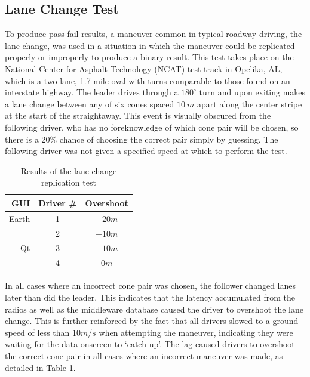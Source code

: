 \documentclass[twocolumn,10pt]{article}
\begin{document}
  \subsection*{Lane Change Test}

    To produce pass-fail results, a maneuver common in typical roadway driving, the lane change, was used in a situation in which the maneuver could be replicated properly or improperly to produce a binary result.  This test takes place on the National Center for Asphalt Technology (NCAT) test track in Opelika, AL, which is a two lane, 1.7 mile oval with turns comparable to those found on an interstate highway.  The leader drives through a $180^{\circ}$ turn and upon exiting makes a lane change between any of six cones spaced $10~m$ apart along the center stripe at the start of the straightaway.  This event is visually obscured from the following driver, who has no foreknowledge of which cone pair will be chosen, so there is a 20\% chance of choosing the correct pair simply by guessing.  The following driver was not given a specified speed at which to perform the test.

    \begin{table}[htbp] \centering
      \caption{Results of the lane change replication test}
      \begin{tabular}{rc|c}
        GUI&    Driver \#&     Overshoot \\\hline\hline
        Earth&      1       &       $+20m$  \\
             &      2       &       $+10m$  \\ \hline
        Qt   &      3       &       $+10m$  \\
             &      4       &       $0m$    \\ \hline  
      \end{tabular}
      \label{tab:lanechangeresults}
    \end{table}

    In all cases where an incorrect cone pair was chosen, the follower changed lanes later than did the leader.  This indicates that the latency accumulated from the radios as well as the middleware database caused the driver to overshoot the lane change.  This is further reinforced by the fact that all drivers slowed to a ground speed of less than $10m/s$ when attempting the maneuver, indicating they were waiting for the data onscreen to `catch up'.  The lag caused drivers to overshoot the correct cone pair in all cases where an incorrect maneuver was made, as detailed in Table \ref{tab:lanechangeresults}.
\end{document}
